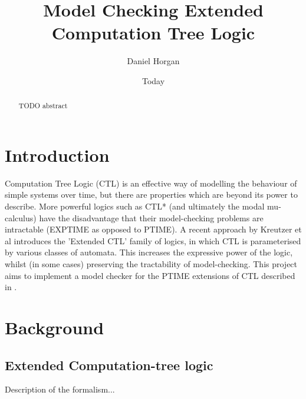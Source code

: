 \documentclass[11pt]{article}
\begin{document}
\title{Model Checking Extended Computation Tree Logic}
\author{Daniel Horgan}
\date{Today}
\maketitle

\begin{comment}
[scratch]
Blablabla said Nobody ~\cite{Nobody06}.
\end{comment}

\begin{abstract}

TODO abstract

\end{abstract}

\section{Introduction}

Computation Tree Logic (CTL) is an effective way of modelling the behaviour of simple systems over time, but there are properties which are beyond its power to describe. More powerful logics such as CTL* (and ultimately the modal mu-calculus) have the disadvantage that their model-checking problems are intractable (EXPTIME as opposed to PTIME). A recent approach by Kreutzer et al \cite{Kreutzer10} introduces the 'Extended CTL' family of logics, in which CTL is parameterised by various classes of automata. This increases the expressive power of the logic, whilst (in some cases) preserving the tractability of model-checking. This project aims to implement a model checker for the PTIME extensions of CTL described in \cite{Kreutzer10}.


\section{Background}

\subsection{Extended Computation-tree logic}
Description of the formalism...
\end{document}
